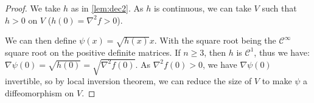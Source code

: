 \documentclass[10pt]{report}
\theoremstyle{plain}
\theoremstyle{definition}
\theoremstyle{remark}
\renewcommand{\geq}{\geqslant}
\newcommand{\class}[1]{{\mathscr{C}^{#1}}}
\begin{document}
\begin{proof}
  We take $h$ as in \cref{lem:dec2}. As $h$ is continuous, we can take $V$ such
  that $h > 0$ on $V$ ($h(0) = \nabla^2 f > 0$).

  We can then define $\psi(x) = \sqrt{h(x)} x$. With the square root being the
  $\class{\infty}$ square root on the positive definite matrices.
  If $n \geq 3$, then $h$ is $\class 1$, thus we have: $\nabla \psi(0) =
  \sqrt{h(0)} = \sqrt{\nabla^2 f(0)}$. As $\nabla^2
  f(0) > 0$, we have $\nabla \psi(0)$ invertible, so by local inversion theorem,
  we can reduce the size of $V$ to make $\psi$ a diffeomorphism on $V$.

\end{proof}




\end{document}
